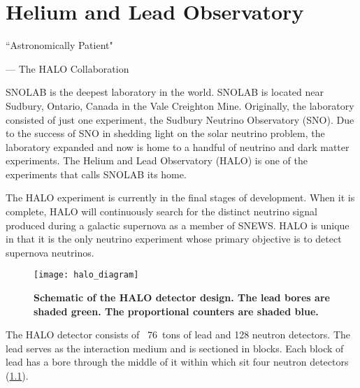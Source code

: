 %
%
%
%


\chapter{Helium and Lead Observatory}
	\label{halo_chapter}

	\begin{quoting}
		\noindent \large ``Astronomically Patient" \normalsize

		--- The HALO Collaboration
	\end{quoting}

	 SNOLAB is the deepest laboratory in the world. SNOLAB is located near Sudbury, Ontario, Canada in the Vale Creighton Mine. Originally, the laboratory consisted of just one experiment, the Sudbury Neutrino Observatory (SNO). Due to the success of SNO in shedding light on the solar neutrino problem, the laboratory expanded and now is home to a handful of neutrino and dark matter experiments. The Helium and Lead Observatory (HALO) is one of the experiments that calls SNOLAB its home. 

	The HALO experiment is currently in the final stages of development. When it is complete, HALO will continuously search for the distinct neutrino signal produced during a galactic supernova as a member of SNEWS. HALO is unique in that it is the only neutrino experiment whose primary objective is to detect supernova neutrinos.

	\begin{figure}[H]
		\texttt{[image: halo\_diagram]}
		\caption[The HALO Detector]{\bf Schematic of the HALO detector design. \rm The lead bores are shaded green. The \he proportional counters are shaded blue.}
		\label{fig:halo}
	\end{figure}

	The HALO detector consists of \ \SI[mode=text]{76}{tons} of lead and 128 \he neutron detectors. The lead serves as the interaction medium and is sectioned in blocks. Each block of lead has a bore through the middle of it within which sit four \he neutron detectors \nolinebreak (\FIG \ref{fig:halo}).

